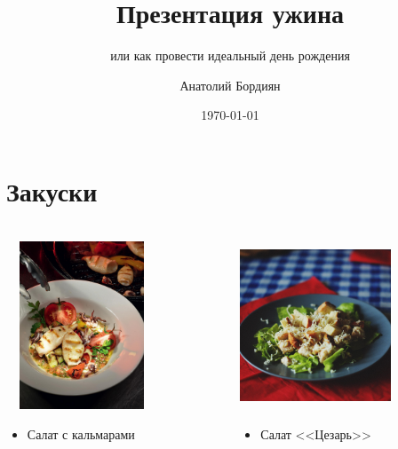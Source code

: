\documentclass[t]{beamer}  %
\title{Презентация ужина}
\subtitle{или как провести идеальный день рождения}
\author{Анатолий Бордиян}
\date{\today}
\institute{Конфетки, бараночки ltd.}
\begin{document}
\frame[plain]{\titlepage}	%

\section{Закуски}
 
\begin{frame}
	\frametitle{\insertsection} 
	\framesubtitle{\insertsubsection}
	\begin{columns}
		\begin{column}[t]{0.5\linewidth}
			\includegraphics[height=5cm, width=4.5cm]{salad_with_squids.jpg}
			\begin{itemize}
				\item Салат с кальмарами
			\end{itemize}
		\end{column}	
	\pause	
		\begin{column}[t]{0.5\linewidth}
			\includegraphics[height=5cm, width=4.5cm]{Cezar.jpg}
			\begin{itemize}
				\item Салат <<Цезарь>>
			\end{itemize}
		\end{column}
	\end{columns}
\end{frame}
\end{document}
